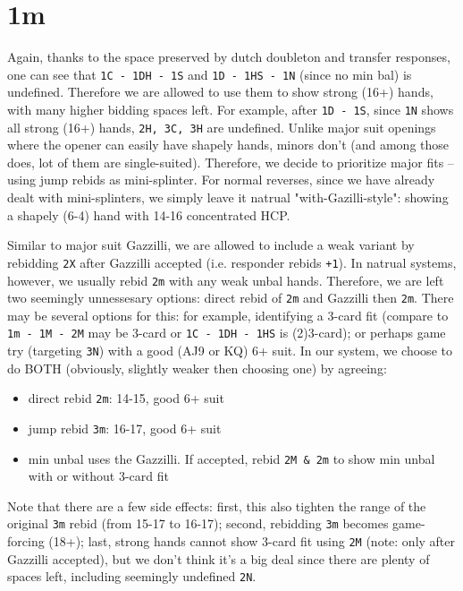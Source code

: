 \section{1m}

Again, thanks to the space preserved by dutch doubleton and transfer responses, one can see that \texttt{1C - 1DH - 1S} and \texttt{1D - 1HS - 1N} (since no min bal) is undefined.
Therefore we are allowed to use them to show strong (16+) hands, with many higher bidding spaces left.
For example, after \texttt{1D - 1S}, since \texttt{1N} shows all strong (16+) hands, \texttt{2H, 3C, 3H} are undefined.
Unlike major suit openings where the opener can easily have shapely hands, minors don't (and among those does, lot of them are single-suited).
Therefore, we decide to prioritize major fits -- using jump rebids as mini-splinter.
For normal reverses, since we have already dealt with mini-splinters, we simply leave it natrual "with-Gazilli-style": showing a shapely (6-4) hand with 14-16 concentrated HCP.


Similar to major suit Gazzilli, we are allowed to include a weak variant by rebidding \texttt{2X} after Gazzilli accepted (i.e. responder rebids \texttt{+1}).
In natrual systems, however, we usually rebid \texttt{2m} with any weak unbal hands. Therefore, we are left two seemingly unnessesary options: direct rebid of \texttt{2m} and Gazzilli then \texttt{2m}.
There may be several options for this: for example, identifying a 3-card fit (compare to \texttt{1m - 1M - 2M} may be 3-card or \texttt{1C - 1DH - 1HS} is (2)3-card); or perhaps game try (targeting \texttt{3N}) with a good (AJ9 or KQ) 6+ suit.
In our system, we choose to do BOTH (obviously, slightly weaker then choosing one) by agreeing:
\begin{itemize}
  \setlength\itemsep{0pt}
  \item direct rebid \texttt{2m}: 14-15, good 6+ suit
  \item jump rebid \texttt{3m}: 16-17, good 6+ suit
  \item min unbal uses the Gazzilli. If accepted, rebid \texttt{2M \& 2m} to show min unbal with or without 3-card fit
\end{itemize}
Note that there are a few side effects: first, this also tighten the range of the original \texttt{3m} rebid (from 15-17 to 16-17);
second, rebidding \texttt{3m} becomes game-forcing (18+);
last, strong hands cannot show 3-card fit using \texttt{2M} (note: only after Gazzilli accepted), but we don't think it's a big deal since there are plenty of spaces left, including seemingly undefined \texttt{2N}.

